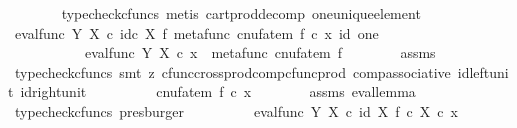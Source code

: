 \begin{isabellebody}
\ \ \ \ \ \ \isamarkupfalse%
\ {\isacharparenleft}{\kern0pt}typecheck{\isacharunderscore}{\kern0pt}cfuncs{\isacharcomma}{\kern0pt}\ metis\ cart{\isacharunderscore}{\kern0pt}prod{\isacharunderscore}{\kern0pt}decomp\ one{\isacharunderscore}{\kern0pt}unique{\isacharunderscore}{\kern0pt}element{\isacharparenright}{\kern0pt}\isanewline
\ \ \ \ \isamarkupfalse%
\ {\isachardoublequoteopen}{\isacharparenleft}{\kern0pt}eval{\isacharunderscore}{\kern0pt}func\ Y\ X\ {\isasymcirc}\isactrlsub c\ id\isactrlsub c\ X\ {\isasymtimes}\isactrlsub f\ metafunc\ {\isacharparenleft}{\kern0pt}cnufatem\ f{\isacharparenright}{\kern0pt}{\isacharparenright}{\kern0pt}\ {\isasymcirc}\isactrlsub c\ {\isasymlangle}x{\isacharcomma}{\kern0pt}\ id\ one{\isasymrangle}\ {\isacharequal}{\kern0pt}\isanewline
\ \ \ \ \ \ \ \ \ \ \ eval{\isacharunderscore}{\kern0pt}func\ Y\ X\ {\isasymcirc}\isactrlsub c\ {\isasymlangle}x\ {\isacharcomma}{\kern0pt}\ metafunc\ {\isacharparenleft}{\kern0pt}cnufatem\ f{\isacharparenright}{\kern0pt}{\isasymrangle}{\isachardoublequoteclose}\isanewline
\ \ \ \ \ \ \isamarkupfalse%
\ assms\ \isamarkupfalse%
\ {\isacharparenleft}{\kern0pt}typecheck{\isacharunderscore}{\kern0pt}cfuncs{\isacharcomma}{\kern0pt}\ smt\ {\isacharparenleft}{\kern0pt}z{}{\isacharparenright}{\kern0pt}\ cfunc{\isacharunderscore}{\kern0pt}cross{\isacharunderscore}{\kern0pt}prod{\isacharunderscore}{\kern0pt}comp{\isacharunderscore}{\kern0pt}cfunc{\isacharunderscore}{\kern0pt}prod\ comp{\isacharunderscore}{\kern0pt}associative{}\ id{\isacharunderscore}{\kern0pt}left{\isacharunderscore}{\kern0pt}unit{}\ id{\isacharunderscore}{\kern0pt}right{\isacharunderscore}{\kern0pt}unit{}{\isacharparenright}{\kern0pt}\isanewline
\ \ \ \ \isamarkupfalse%
\ \isamarkupfalse%
\ {\isachardoublequoteopen}{\isachardot}{\kern0pt}{\isachardot}{\kern0pt}{\isachardot}{\kern0pt}\ {\isacharequal}{\kern0pt}\ {\isacharparenleft}{\kern0pt}cnufatem\ f{\isacharparenright}{\kern0pt}\ {\isasymcirc}\isactrlsub c\ x{\isachardoublequoteclose}\isanewline
\ \ \ \ \ \ \isamarkupfalse%
\ assms\ eval{\isacharunderscore}{\kern0pt}lemma\ \isamarkupfalse%
\ {\isacharparenleft}{\kern0pt}typecheck{\isacharunderscore}{\kern0pt}cfuncs{\isacharcomma}{\kern0pt}\ presburger{\isacharparenright}{\kern0pt}\isanewline
\ \ \ \ \isamarkupfalse%
\ \isamarkupfalse%
\ {\isachardoublequoteopen}{\isachardot}{\kern0pt}{\isachardot}{\kern0pt}{\isachardot}{\kern0pt}\ {\isacharequal}{\kern0pt}\ {\isacharparenleft}{\kern0pt}eval{\isacharunderscore}{\kern0pt}func\ Y\ X\ {\isasymcirc}\isactrlsub c\ {\isasymlangle}id\ X{\isacharcomma}{\kern0pt}\ f\ {\isasymcirc}\isactrlsub c\ {\isasymbeta}\isactrlbsub X\isactrlesub {\isasymrangle}{\isacharparenright}{\kern0pt}\ {\isasymcirc}\isactrlsub c\ x{\isachardoublequoteclose}\isanewline

\end{isabellebody}
